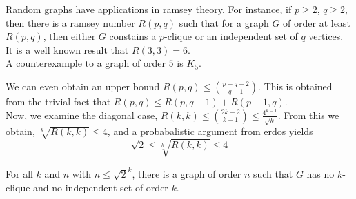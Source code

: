 \begin{remark}
Random graphs have applications in ramsey theory. For instance, if \(p \ge 2\), \(q\ge 2\), then there is a ramsey number \(R\left( p,q \right) \) such that for a graph \(G\) of order at least \(R\left( p, q \right) \), then either \(G\) constains a \(p\)-clique or an independent set of \(q\) vertices.\\
It is a well known result that \(R\left( 3, 3 \right) =6\).\\
A counterexample to a graph of order \(5\) is \(K_{5} \).
\end{remark}
We can even obtain an upper bound  \(R\left( p, q \right) \le \binom{p + q - 2}{q - 1}\). This is obtained from the trivial fact that \(R\left( p, q  \right) \le R\left( p, q-1 \right)  + R\left(  p-1, q \right) \).\\
Now, we examine the diagonal case, \(R\left( k, k \right) \le \binom{2k-2}{k-1}\le \frac{4^{k-1}}{\sqrt{k} }\). From this we obtain, \(\sqrt[k]{R\left( k, k \right) }  \le 4\), and a probabalistic argument from erdos yields \[\sqrt{2}  \le \sqrt[k]{R\left( k, k \right)} \le 4  \]
\begin{proposition}
	For all \(k\) and \(n\) with \(n \le \sqrt{2} ^{k}\), there is a graph of order \(n\) such that \(G\) has no \(k\)-clique and no independent set of order \(k\).
\end{proposition}
